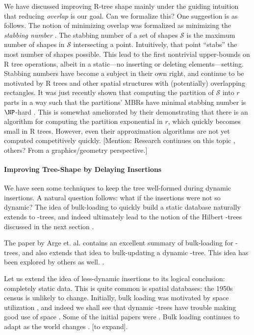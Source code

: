 We have discussed improving R-tree shape mainly under the guiding intuition that reducing \emph{overlap} is our goal.
Can we formalize this?
One suggestion is as follows.
The notion of minimizing overlap was formalized as minimizing the \emph{stabbing number} \cite{berggudmundssonhammarovermars00}.
The stabbing number of a set of shapes $\mathcal S$ is the maximum number of shapes in $\mathcal S$ intersecting a point.
Intuitively, that point ``stabs'' the most number of shapes possible.
This lead to the first nontrivial upper-bounds on R tree operations, albeit in a static---no inserting or deleting elements---setting.
Stabbing numbers have become a subject in their own right, and continue to be motivated by R trees and other spatial structures with (potentially) overlapping rectangles.
It was just recently shown that computing the partition of $\mathcal S$ into $r$ parts in a way such that the partitions' MBRs have minimal stabbing number is $\NP$-hard \cite{bergkhosraviverdonschotweele11}.
This is somewhat ameliorated by their demonstrating that there is an algorithm for computing the partition exponential in $r$, which quickly becomes small in R trees.
However, even their approximation algorithms are not yet computed competitively quickly.
[Mention: Research continues on this topic \cite{durochermehrabi12}, others? From a graphics/geometry perspective.]

\paragraph{Improving Tree-Shape by Delaying Insertions}
We have seen some techniques to keep the tree well-formed during dynamic insertions.
A natural question follows: what if the insertions were not so dynamic?
The idea of bulk-loading to quickly build a static database naturally extends to \rbase-trees, and indeed ultimately lead to the notion of the Hilbert \rbase-trees discussed in the next section \cite{kamelfaloutosos94}.

The paper by Arge et. al. \cite{argehinrichsvahrenholdvitter99} contains an excellent summary of bulk-loading for \rbase-trees, and also extends that idea to bulk-updating a dynamic \rbase-tree.
This idea has been explored by others as well.
\cite{biveinissaltenisjensen07}.

Let us extend the idea of less-dynamic insertions to its logical conclusion: completely static data.
This is quite common is spatial databases: the 1950s census is unlikely to change.
Initially, bulk loading was motivated by space utilization \cite{tocite}, and indeed we shall see that dynamic \rbase-trees have trouble making good use of space \cite{tocite}. %
Some of the initial papers were \cite{tocite}.
Bulk loading continues to adapt as the world changes \cite{tanluomaoni12}. 
[to expand].

